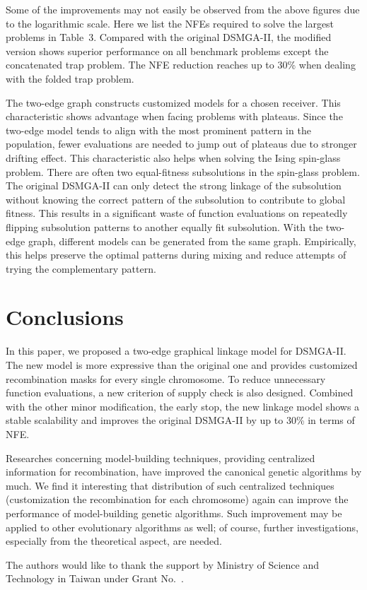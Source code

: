 Some of the improvements may not easily be observed from the above figures due to the logarithmic scale. Here we list the NFEs required to solve the largest problems in Table~3.  Compared with the original DSMGA-II, the modified version shows superior performance on all benchmark problems except the concatenated trap problem. The NFE reduction reaches up to 30\% when dealing with the folded trap problem.

The two-edge graph constructs customized models for a chosen receiver. 
This characteristic shows advantage when facing problems with plateaus.
Since the two-edge model tends to align with the most prominent pattern in the population, fewer evaluations are needed to jump out of plateaus due to stronger drifting effect. This characteristic also helps when solving the Ising spin-glass problem. 
There are often two equal-fitness subsolutions in the spin-glass problem.
The original DSMGA-II can only detect the strong linkage of the subsolution without knowing the correct pattern of the subsolution to contribute to global fitness.
This results in a significant waste of function evaluations on repeatedly flipping subsolution patterns to another equally fit subsolution.
With the two-edge graph, different models can be generated from the same graph. 
Empirically, this helps preserve the optimal patterns during mixing and reduce attempts of trying the complementary pattern.



\section{Conclusions}
 
In this paper, we proposed a two-edge graphical linkage model for DSMGA-II. 
The new model is more expressive than the original one and provides customized recombination masks for every single chromosome. 
To reduce unnecessary function evaluations, a new criterion of supply check  is also designed. Combined with the other minor modification, the early stop, the new linkage model shows a stable scalability and improves the original DSMGA-II by up to 30\% in terms of NFE.



Researches concerning model-building techniques, providing centralized information for recombination, have improved the canonical genetic algorithms by much. 
We find it interesting that distribution of such centralized techniques (customization the recombination for each chromosome) again can improve the performance of model-building genetic algorithms. 
Such improvement may be applied to other evolutionary algorithms as well; of course,  further investigations, especially from the theoretical aspect, are needed.  


\begin{acks}
The authors would like to thank the support by Ministry of Science and Technology in Taiwan under Grant
No.~.
\end{acks}
